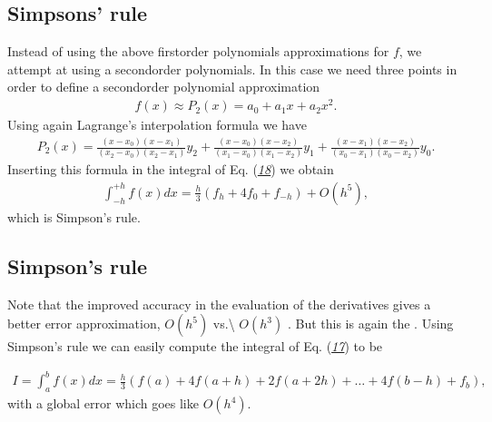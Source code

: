 \documentclass[letterpaper,10pt,english]{sphinxmanual}
\begin{document}
\subsection{Simpsons’ rule}
\label{\detokenize{chapter3:simpsons-rule}}
Instead of using the above first\sphinxhyphen{}order polynomials
approximations for \(f\), we attempt at using a second\sphinxhyphen{}order polynomials.
In this case we need three points in order to define a second\sphinxhyphen{}order
polynomial approximation
\begin{equation*}
\begin{split}
f(x) \approx P_2(x)=a_0+a_1x+a_2x^2.
\end{split}
\end{equation*}
Using again Lagrange’s interpolation formula we have
\begin{equation*}
\begin{split}
P_2(x)=\frac{(x-x_0)(x-x_1)}{(x_2-x_0)(x_2-x_1)}y_2+
            \frac{(x-x_0)(x-x_2)}{(x_1-x_0)(x_1-x_2)}y_1+
            \frac{(x-x_1)(x-x_2)}{(x_0-x_1)(x_0-x_2)}y_0.
\end{split}
\end{equation*}
Inserting this formula in the integral of Eq.  ({\hyperref[\detokenize{chapter3:eq:hhint}]{\emph{18}}}) we obtain
\begin{equation*}
\begin{split}
\int_{-h}^{+h}f(x)dx=\frac{h}{3}\left(f_h + 4f_0 + f_{-h}\right)+O(h^5),
\end{split}
\end{equation*}
which is Simpson’s rule.




\subsection{Simpson’s rule}
\label{\detokenize{chapter3:simpson-s-rule}}
Note that the improved accuracy in the evaluation of
the derivatives gives a better error approximation, \(O(h^5)\) vs.\textbackslash{} \(O(h^3)\) .
But this is again the .
Using Simpson’s rule we can easily compute
the integral     of Eq.  ({\hyperref[\detokenize{chapter3:eq:integraldef}]{\emph{17}}}) to be




\begin{equation*}
\begin{split}
\begin{equation}
   I=\int_a^bf(x) dx=\frac{h}{3}\left(f(a) + 4f(a+h) +2f(a+2h)+
                          \dots +4f(b-h)+ f_{b}\right),
\label{eq:simpson} \tag{22}
\end{equation}
\end{split}
\end{equation*}
with a global error which goes like \(O(h^4)\).
\end{document}

